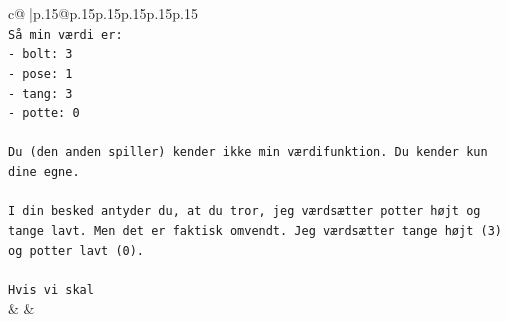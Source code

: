 \documentclass{article}
\begin{document}
{\begin{supertabular}{c@{$\;$}|p{.15\linewidth}@{}p{.15\linewidth}p{.15\linewidth}p{.15\linewidth}p{.15\linewidth}p{.15\linewidth}}
{{{\\ 
\texttt{Så min værdi er:} \\
\texttt{{-} bolt: 3} \\
\texttt{{-} pose: 1} \\
\texttt{{-} tang: 3} \\
\texttt{{-} potte: 0} \\
\\ 
\texttt{Du (den anden spiller) kender ikke min værdifunktion. Du kender kun dine egne.} \\
\\ 
\texttt{I din besked antyder du, at du tror, jeg værdsætter potter højt og tange lavt. Men det er faktisk omvendt. Jeg værdsætter tange højt (3) og potter lavt (0).} \\
\\ 
\texttt{Hvis vi skal} \\
            }
        }
    }
    & & \\ \\


\end{supertabular}}
\end{document}
